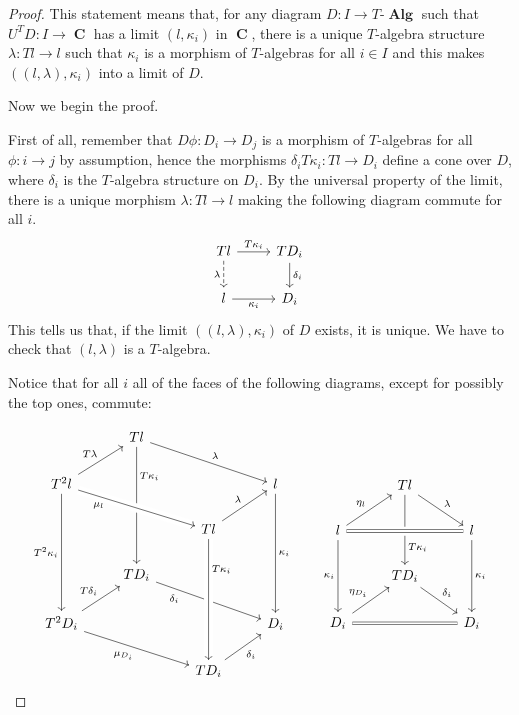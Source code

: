 \documentclass[a4paper,11pt,twoside, openany]{book}
\DeclareMathOperator{\Alg}{\mathbf{Alg}}
\DeclareMathOperator{\C}{\mathbf{C}}
\theoremstyle{definition}
\theoremstyle{definition}
\theoremstyle{remark}
\begin{document}
	\begin{proof}
		This statement means that, for any diagram $D\colon I\rightarrow T\mbox{-}\Alg$ such that $U^TD\colon I\rightarrow\C$ has a limit $(l,\kappa_i)$ in $\C$, there is a unique $T$-algebra structure $\lambda\colon Tl\rightarrow l$ such that $\kappa_i$ is a morphism of $T$-algebras for all $i\in I$ and this makes $((l,\lambda),\kappa_i)$ into a limit of $D$.
		
		Now we begin the proof.
		
		First of all, remember that $D\phi\colon D_i\rightarrow D_j$ is a morphism of $T$-algebras for all $\phi\colon i\rightarrow j$ by assumption, hence the morphisms $\delta_i T\kappa_i\colon Tl\rightarrow D_i$ define a cone over $D$, where $\delta_i$ is the $T$-algebra structure on $D_i$. By the universal property of the limit, there is a unique morphism $\lambda\colon Tl\rightarrow l$ making the following diagram commute for all $i$.
		\[
		\begin{tikzcd}
		Tl\ar[d, dashed, "\lambda"'] \ar[r, "T\kappa_i"]
		& TD_i\ar[d, "\delta_i"]\\
		l\ar[r, "\kappa_i"']
		& D_i
		\end{tikzcd}
		\]	
		This tells us that, if the limit $((l,\lambda),\kappa_i)$ of $D$ exists, it is unique. We have to check that $(l,\lambda)$ is a $T$-algebra.
		
		Notice that for all $i$ all of the faces of the following diagrams, except for possibly the top ones, commute:
		
		\[
		\begin{tikzcd}
		& Tl\ar[drr, "\lambda"]\ar[ddd, "T\kappa_i" near start] \\
		T^2l\ar[ur, "T\lambda"]\ar[drr, crossing over, "\mu_l" near start, swap]\ar[ddd, "T^2\kappa_i"']
		&&& l\ar[ddd, "\kappa_i"] \\
		&& Tl\ar[ur, "\lambda"]%
		\\
		& TD_i\ar[drr, swap, "\delta_i" near start] \\
		T^2D_i\ar[ur, "T\delta_i"]\ar[drr, "\mu_{D_i}"']
		&&& D_i \\
		&& TD_i\ar[ur, "\delta_i"'] \ar[from=uuu,crossing over,  "T\kappa_i" near start]
		\end{tikzcd}
		\quad\quad
		\begin{tikzcd}
		& Tl\ar[dr, "\lambda"]\ar[dd, "T\kappa_i" near end] \\
		l\ar[ur, "\eta_l"]\ar[rr, crossing over, equal]\ar[dd, swap, "\kappa_i"]
		&& l\ar[dd, "\kappa_i"] \\
		& TD_i\ar[dr, "\delta_i"] \\
		D_i\ar[ur, "\eta_{D_i}"]\ar[rr, equal]
		&& D_i
		\end{tikzcd}
		\]
		

\end{proof}
\end{document}
